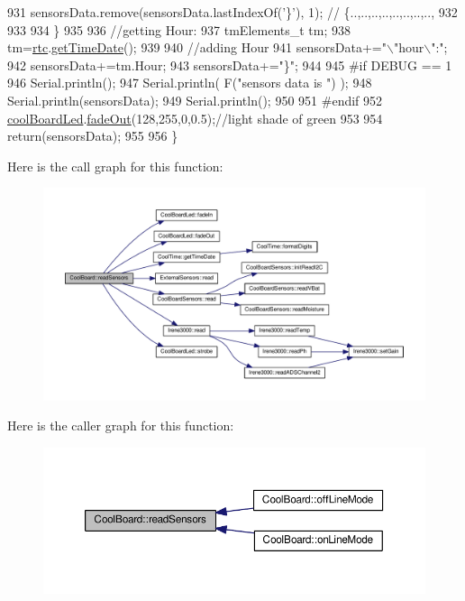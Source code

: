 \begin{DoxyCode}
931         sensorsData.remove(sensorsData.lastIndexOf(\textcolor{charliteral}{'\}'}), 1); \textcolor{comment}{// \{..,..,..,..,..,..,..,..,}
932         
933         
934     \}
935 
936     \textcolor{comment}{//getting Hour:}
937     tmElements\_t tm;
938     tm=\hyperlink{classCoolBoard_a50d2a6716879d64a85f3c6b44ad63275}{rtc}.\hyperlink{classCoolTime_a7a7501c5ca77dd1248bea704c44f986c}{getTimeDate}();
939     
940     \textcolor{comment}{//adding Hour}
941     sensorsData+=\textcolor{stringliteral}{"\(\backslash\)"hour\(\backslash\)":"};   
942     sensorsData+=tm.Hour;
943     sensorsData+=\textcolor{stringliteral}{"\}"};
944     
945 \textcolor{preprocessor}{#if DEBUG == 1}
946     Serial.println();
947     Serial.println( F(\textcolor{stringliteral}{"sensors data is "}) );
948     Serial.println(sensorsData);
949     Serial.println();
950 
951 \textcolor{preprocessor}{#endif}
952     \hyperlink{classCoolBoard_a1b1d3c684a5baa56b08486e192fd8e97}{coolBoardLed}.\hyperlink{classCoolBoardLed_a93d545679237e8cc858324367149775c}{fadeOut}(128,255,0,0.5);\textcolor{comment}{//light shade of green}
953 
954     \textcolor{keywordflow}{return}(sensorsData);
955 
956 \}
\end{DoxyCode}
Here is the call graph for this function\+:
\nopagebreak
\begin{figure}[H]
\begin{center}
\leavevmode
\includegraphics[width=350pt]{classCoolBoard_ad03abdce2e65f520bbf2cff0f2d083cf_cgraph}
\end{center}
\end{figure}
Here is the caller graph for this function\+:
\nopagebreak
\begin{figure}[H]
\begin{center}
\leavevmode
\includegraphics[width=350pt]{classCoolBoard_ad03abdce2e65f520bbf2cff0f2d083cf_icgraph}
\end{center}
\end{figure}
\mbox{\label{classCoolBoard_a5d0c8ff93b615efd676be432de9f164a}} 
